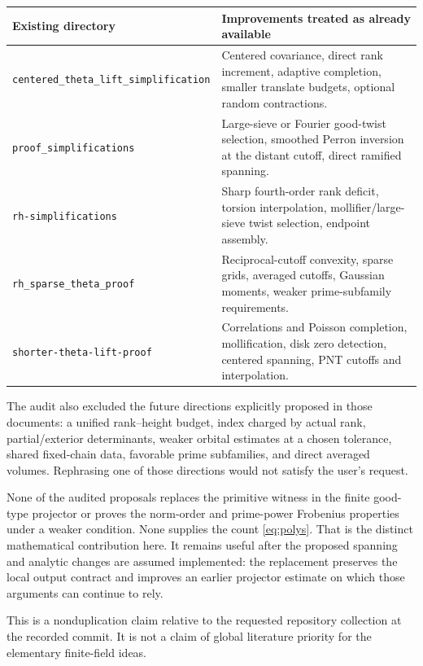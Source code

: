 \documentclass[11pt,a4paper]{article}
\newcommand{\src}[1]{\nolinkurl{#1}}
\theoremstyle{definition}
\theoremstyle{remark}
\begin{document}
\begin{center}
\small
\begin{tabularx}{\textwidth}{@{}p{}Y@{}}
\toprule
Existing directory & Improvements treated as already available \\
\midrule
\src{centered_theta_lift_simplification} & Centered covariance, direct rank increment, adaptive completion, smaller translate budgets, optional random contractions. \\
\src{proof_simplifications} & Large-sieve or Fourier good-twist selection, smoothed Perron inversion at the distant cutoff, direct ramified spanning. \\
\src{rh-simplifications} & Sharp fourth-order rank deficit, torsion interpolation, mollifier/large-sieve twist selection, endpoint assembly. \\
\src{rh_sparse_theta_proof} & Reciprocal-cutoff convexity, sparse grids, averaged cutoffs, Gaussian moments, weaker prime-subfamily requirements. \\
\src{shorter-theta-lift-proof} & Correlations and Poisson completion, mollification, disk zero detection, centered spanning, PNT cutoffs and interpolation. \\
\bottomrule
\end{tabularx}
\end{center}

The audit also excluded the future directions explicitly proposed in
those documents: a unified rank--height budget, index charged by actual
rank, partial/exterior determinants, weaker orbital estimates at a
chosen tolerance, shared fixed-chain data, favorable prime subfamilies,
and direct averaged volumes. Rephrasing one of those directions would
not satisfy the user's request.

None of the audited proposals replaces the primitive witness in the
finite good-type projector or proves the norm-order and prime-power
Frobenius properties under a weaker condition. None supplies the count
\eqref{eq:polys}. That is the distinct mathematical contribution here.
It remains useful after the proposed spanning and analytic changes are
assumed implemented: the replacement preserves the local output contract
and improves an earlier projector estimate on which those arguments can
continue to rely.

This is a nonduplication claim relative to the requested repository
collection at the recorded commit. It is not a claim of global literature
priority for the elementary finite-field ideas.
\end{document}
